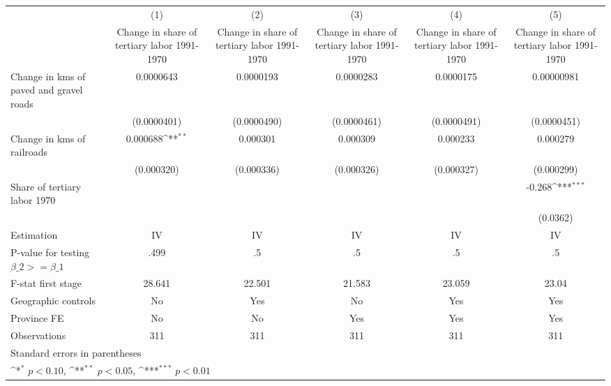 {
\def\sym#1{\ifmmode^{#1}\else\(^{#1}\)\fi}
\begin{tabular}{l*{5}{c}}
\hline\hline
                    &\multicolumn{1}{c}{(1)}&\multicolumn{1}{c}{(2)}&\multicolumn{1}{c}{(3)}&\multicolumn{1}{c}{(4)}&\multicolumn{1}{c}{(5)}\\
                    &\multicolumn{1}{c}{Change in share of tertiary labor 1991-1970}&\multicolumn{1}{c}{Change in share of tertiary labor 1991-1970}&\multicolumn{1}{c}{Change in share of tertiary labor 1991-1970}&\multicolumn{1}{c}{Change in share of tertiary labor 1991-1970}&\multicolumn{1}{c}{Change in share of tertiary labor 1991-1970}\\
\hline
Change in kms of paved and gravel roads&   0.0000643         &   0.0000193         &   0.0000283         &   0.0000175         &  0.00000981         \\
                    & (0.0000401)         & (0.0000490)         & (0.0000461)         & (0.0000491)         & (0.0000451)         \\
[1em]
Change in kms of railroads&    0.000688\sym{**} &    0.000301         &    0.000309         &    0.000233         &    0.000279         \\
                    &  (0.000320)         &  (0.000336)         &  (0.000326)         &  (0.000327)         &  (0.000299)         \\
[1em]
Share of tertiary labor 1970&                     &                     &                     &                     &      -0.268\sym{***}\\
                    &                     &                     &                     &                     &    (0.0362)         \\
\hline
Estimation          &          IV         &          IV         &          IV         &          IV         &          IV         \\
P-value for testing $\beta\_2 >= \beta\_1$&        .499         &          .5         &          .5         &          .5         &          .5         \\
F-stat first stage  &      28.641         &      22.501         &      21.583         &      23.059         &       23.04         \\
Geographic controls &          No         &         Yes         &          No         &         Yes         &         Yes         \\
Province FE         &          No         &          No         &         Yes         &         Yes         &         Yes         \\
Observations        &         311         &         311         &         311         &         311         &         311         \\
\hline\hline
\multicolumn{6}{l}{\footnotesize Standard errors in parentheses}\\
\multicolumn{6}{l}{\footnotesize \sym{*} \(p<0.10\), \sym{**} \(p<0.05\), \sym{***} \(p<0.01\)}\\
\end{tabular}
}
